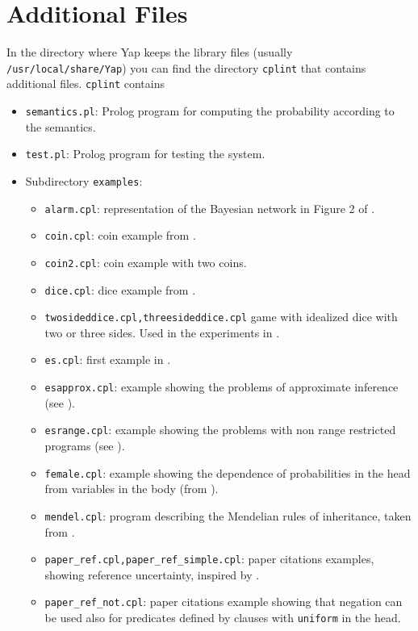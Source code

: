 \documentclass{article}
\begin{document}
\section{Additional Files}
In the directory where Yap keeps the library files (usually \texttt{/usr/local/share/Yap}) you can find the directory \texttt{cplint} that contains additional files.
\texttt{cplint} contains
\begin{itemize}
\item \texttt{semantics.pl}: Prolog program for computing the probability according to the semantics.
\item \texttt{test.pl}: Prolog program for testing the system. 
\item Subdirectory \texttt{examples}:
\begin{itemize}
\item \texttt{alarm.cpl}: representation of the Bayesian network in Figure 2 of
 \cite{VenVer04-ICLP04-IC}.
\item \texttt{coin.cpl}: coin example from   \cite{VenVer04-ICLP04-IC}.
\item \texttt{coin2.cpl}: coin example with two coins.
\item \texttt{dice.cpl}: dice example from \cite{VenVer04-ICLP04-IC}.
\item \verb|twosideddice.cpl,threesideddice.cpl|  game with idealized dice with two or three  sides. Used in the experiments in \cite{Rig-RCRA07-IC}.
\item \texttt{es.cpl}: first example in \cite{Rig-RCRA07-IC}.
\item \texttt{esapprox.cpl}: example showing the problems of approximate inference (see \cite{Rig-RCRA07-IC}).
\item \texttt{esrange.cpl}: example showing the problems with non range restricted programs (see \cite{Rig-RCRA07-IC}).
\item \texttt{female.cpl}: example showing the dependence of probabilities in the head from variables in the body (from \cite{VenVer04-ICLP04-IC}).
\item \texttt{mendel.cpl}: program describing the Mendelian rules of inheritance, taken from \cite{Blo04-ILP04WIP-IC}.
\item \verb|paper_ref.cpl,paper_ref_simple.cpl|: paper citations examples, showing reference uncertainty, inspired by \cite{Getoor+al:JMLR02}.
\item \verb|paper_ref_not.cpl|: paper citations example showing that negation can be used also for predicates defined by clauses with \texttt{uniform} in the head.

\end{itemize}
\end{itemize}
\end{document}
